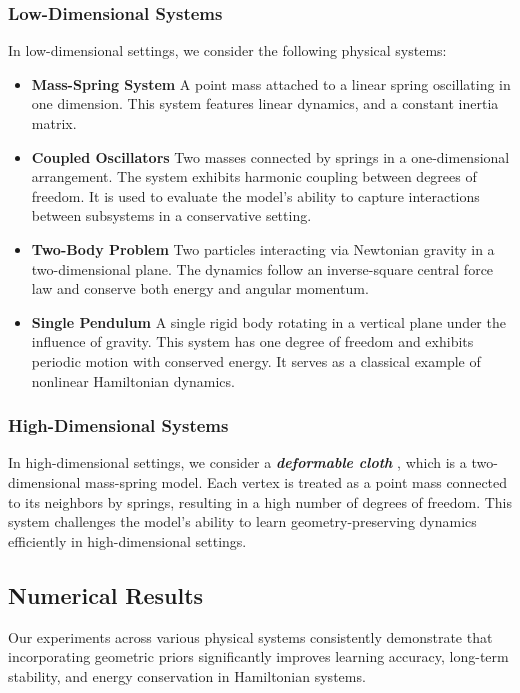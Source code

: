 \documentclass{article}
\theoremstyle{plain}
\theoremstyle{definition}
\theoremstyle{remark}
\begin{document}
\subsubsection{Low-Dimensional Systems}
In low-dimensional settings, we consider the following physical systems:
\begin{itemize}
    \item \textbf{Mass-Spring System} A point mass attached to a linear spring oscillating in one dimension. This system features linear dynamics, and a constant inertia matrix.
    \item \textbf{Coupled Oscillators} Two masses connected by springs in a one-dimensional arrangement. The system exhibits harmonic coupling between degrees of freedom. It is used to evaluate the model's ability to capture interactions between subsystems in a conservative setting.
    \item \textbf{Two-Body Problem} Two particles interacting via Newtonian gravity in a two-dimensional plane. The dynamics follow an inverse-square central force law and conserve both energy and angular momentum. 
    \item \textbf{Single Pendulum} A single rigid body rotating in a vertical plane under the influence of gravity. This system has one degree of freedom and exhibits periodic motion with conserved energy. It serves as a classical example of nonlinear Hamiltonian dynamics.
\end{itemize}











\subsubsection{High-Dimensional Systems}
In high-dimensional settings, we consider a \textbf{\emph{deformable cloth}} \cite{friedl2025riemannianframeworklearningreducedorder}, which is a two-dimensional mass-spring model. Each vertex is treated as a point mass connected to its neighbors by springs, resulting in a high number of degrees of freedom. This system challenges the model’s ability to learn geometry-preserving dynamics efficiently in high-dimensional settings.

\subsection{Numerical Results}
Our experiments across various physical systems consistently demonstrate that incorporating geometric priors significantly improves learning accuracy, long-term stability, and energy conservation in Hamiltonian systems.
\end{document}
